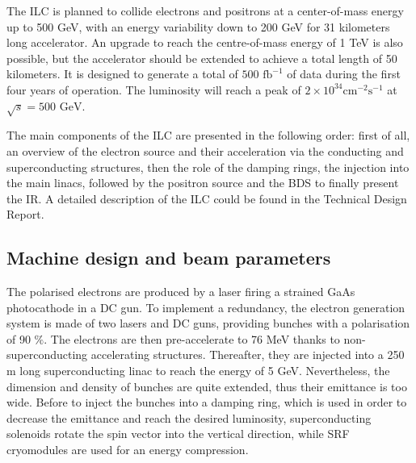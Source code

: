     The \gls{ILC} is planned to collide electrons and positrons at a center-of-mass energy up to 500 GeV, with an energy variability down to 200 GeV for 31 kilometers long accelerator. 
    An upgrade to reach the centre-of-mass energy of 1 TeV is also possible, but the accelerator should be extended to achieve a total length of 50 kilometers.
    It is designed to generate a total of $500\text{ fb}^{-1}$ of data during the first four years of operation. The luminosity will reach a peak of $2 \times 10^{34}\text{cm}^{-2}\text{s}^{-1}$ at $\sqrt s = 500\text{ GeV}$.


    The main components of the \gls{ILC} are presented in the following order: first of all, an overview of the electron source and their acceleration via the conducting and superconducting structures, then the role of the damping rings, the injection into the main linacs, followed by the positron source and the \gls{BDS} to finally present the \gls{IR}.
    A detailed description of the \gls{ILC} could be found in the Technical Design Report\cite{Appleby2006}.

    \subsection{Machine design and beam parameters}
    \label{subsec:design}

    The polarised electrons are produced by a laser firing a strained GaAs photocathode in a \gls{DC} gun.
    To implement a redundancy, the electron generation system is made of two lasers and \gls{DC} guns, providing bunches with a polarisation of 90 $\%$.
    The electrons are then pre-accelerate to 76 MeV thanks to non-superconducting accelerating structures.
    Thereafter, they are injected into a 250 m long superconducting linac to reach the energy of 5 GeV.
    Nevertheless, the dimension and density of bunches are quite extended, thus their emittance is too wide.
    Before to inject the bunches into a damping ring, which is used in order to decrease the emittance and reach the desired luminosity, superconducting solenoids rotate the spin vector into the vertical direction, while \gls{SRF} cryomodules are used for an energy compression.
 
